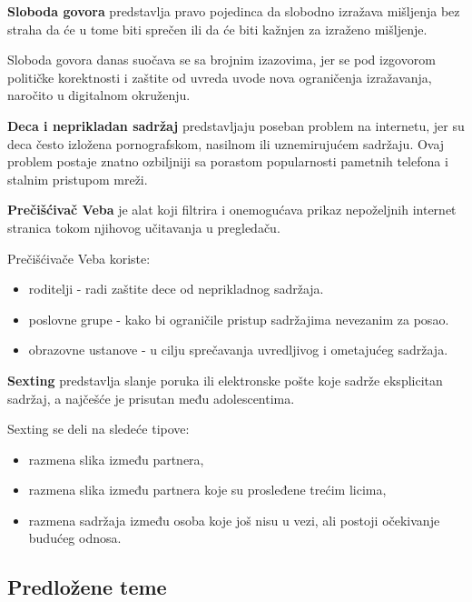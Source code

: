 \documentclass[a4paper, 12pt]{article}
\begin{document}
\vspace{\baselineskip}

\textbf{Sloboda govora} predstavlja pravo pojedinca da slobodno izražava mišljenja bez straha da će u tome biti sprečen ili da će biti kažnjen za izraženo mišljenje.

Sloboda govora danas suočava se sa brojnim izazovima, jer se pod izgovorom
političke korektnosti i zaštite od uvreda uvode nova ograničenja izražavanja, naročito u digitalnom okruženju.

\vspace{\baselineskip}

\textbf{Deca i neprikladan sadržaj} predstavljaju poseban problem na internetu, jer su
deca često izložena pornografskom, nasilnom ili uznemirujućem sadržaju. 
Ovaj problem postaje znatno ozbiljniji sa porastom popularnosti pametnih telefona i stalnim pristupom mreži.

\textbf{Prečišćivač Veba} je alat koji filtrira i onemogućava prikaz nepoželjnih
internet stranica tokom njihovog učitavanja u pregledaču.

Prečišćivače Veba koriste:
\begin{itemize}
    \item roditelji - radi zaštite dece od neprikladnog sadržaja.
    \item poslovne grupe - kako bi ograničile pristup sadržajima nevezanim za posao.
    \item obrazovne ustanove - u cilju sprečavanja uvredljivog i ometajućeg sadržaja.
\end{itemize}

\vspace{\baselineskip}

\textbf{Sexting} predstavlja slanje poruka ili elektronske pošte koje sadrže eksplicitan
sadržaj, a najčešće je prisutan među adolescentima.

Sexting se deli na sledeće tipove:
\begin{itemize}
    \item razmena slika između partnera,
    \item razmena slika između partnera koje su prosleđene trećim licima,
    \item razmena sadržaja između osoba koje još nisu u vezi, ali postoji očekivanje
    budućeg odnosa.
\end{itemize}

\subsection{Predložene teme}
\end{document}

